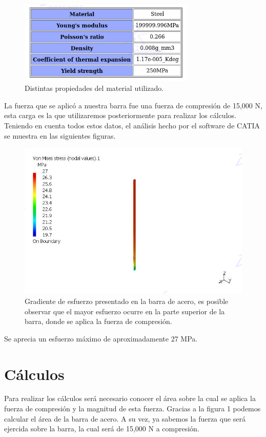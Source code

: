 \documentclass[12pt, letterpaper]{article}
\begin{document}
\begin{figure}[H]
	\centering
	\includegraphics[width=0.75\textwidth]{properties.png}
	\caption{Distintas propiedades del material utilizado.}
\end{figure}
La fuerza que se aplicó a nuestra barra fue una fuerza de compresión de 15,000 N, esta carga es la que utilizaremos posteriormente para realizar los cálculos. Teniendo en cuenta todos estos datos, el análisis hecho por el software de CATIA se muestra en las siguientes figuras.

\begin{figure}[H]
	\centering
	\includegraphics[width=\textwidth]{analisis.png}
	\caption{Gradiente de esfuerzo presentado en la barra de acero, es posible observar que el mayor esfuerzo ocurre en la parte superior de la barra, donde se aplica la fuerza de compresión.}
\end{figure}
Se aprecia un esfuerzo máximo de aproximadamente 27 MPa.
\section*{Cálculos}

Para realizar los cálculos será necesario conocer el área sobre la cual se aplica la fuerza de compresión y la magnitud de esta fuerza. Gracias a la figura 1 podemos calcular el área de la barra de acero. A su vez, ya sabemos la fuerza que será ejercida sobre la barra, la cual será de 15,000 N a compresión.
\end{document}
